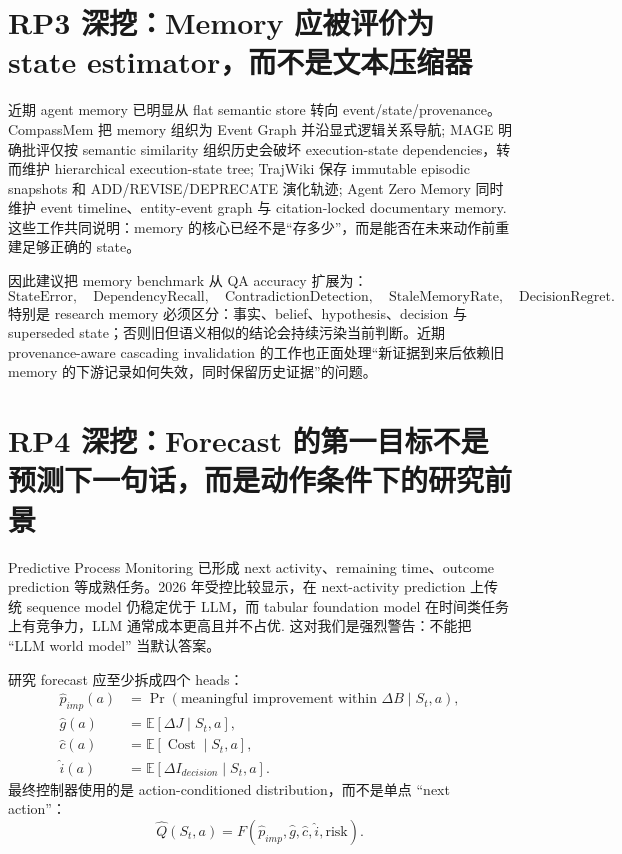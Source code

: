 \documentclass[11pt,a4paper]{ctexart}
\newcommand{\E}{\mathbb{E}}
\newcommand{\Cost}{\operatorname{Cost}}
\begin{document}
\section{RP3 深挖：Memory 应被评价为 state estimator，而不是文本压缩器}

近期 agent memory 已明显从 flat semantic store 转向 event/state/provenance。CompassMem 把 memory 组织为 Event Graph 并沿显式逻辑关系导航\parencite{hu2026compass}; MAGE 明确批评仅按 semantic similarity 组织历史会破坏 execution-state dependencies，转而维护 hierarchical execution-state tree\parencite{chen2026mage}; TrajWiki 保存 immutable episodic snapshots 和 ADD/REVISE/DEPRECATE 演化轨迹\parencite{sun2026trajwiki}; Agent Zero Memory 同时维护 event timeline、entity-event graph 与 citation-locked documentary memory\parencite{wu2026agentzero}. 这些工作共同说明：memory 的核心已经不是“存多少”，而是能否在未来动作前重建足够正确的 state。

因此建议把 memory benchmark 从 QA accuracy 扩展为：
\begin{equation}
\text{StateError},\quad
\text{DependencyRecall},\quad
\text{ContradictionDetection},\quad
\text{StaleMemoryRate},\quad
\text{DecisionRegret}.
\end{equation}
特别是 research memory 必须区分：事实、belief、hypothesis、decision 与 superseded state；否则旧但语义相似的结论会持续污染当前判断。近期 provenance-aware cascading invalidation 的工作也正面处理“新证据到来后依赖旧 memory 的下游记录如何失效，同时保留历史证据”的问题\parencite{wang2026pacmi}。

\section{RP4 深挖：Forecast 的第一目标不是预测下一句话，而是动作条件下的研究前景}

Predictive Process Monitoring 已形成 next activity、remaining time、outcome prediction 等成熟任务。2026 年受控比较显示，在 next-activity prediction 上传统 sequence model 仍稳定优于 LLM，而 tabular foundation model 在时间类任务上有竞争力，LLM 通常成本更高且并不占优\parencite{fertig2026ppm}. 这对我们是强烈警告：不能把 ``LLM world model'' 当默认答案。

研究 forecast 应至少拆成四个 heads：
\begin{align}
\hat p_{imp}(a)&=\Pr(\text{meaningful improvement within }\Delta B\mid S_t,a),\\
\hat g(a)&=\E[\Delta J\mid S_t,a],\\
\hat c(a)&=\E[\Cost\mid S_t,a],\\
\hat i(a)&=\E[\Delta I_{decision}\mid S_t,a].
\end{align}
最终控制器使用的是 action-conditioned distribution，而不是单点 ``next action''：
\begin{equation}
\hat Q(S_t,a)=F(\hat p_{imp},\hat g,\hat c,\hat i,\text{risk}).
\end{equation}
\end{document}
